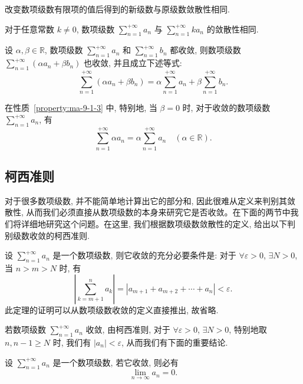\begin{property}\label{property:ma-9-1-1}
改变数项级数有限项的值后得到的新级数与原级数敛散性相同.
\end{property}


\begin{property}\label{property:ma-9-1-2}
对于任意常数 $k\neq0$, 数项级数 $\sum\limits_{n=1}^{+\infty}a_n$ 与 $\sum\limits_{n=1}^{+\infty}ka_n$ 的敛散性相同.
\end{property}


\begin{property}\label{property:ma-9-1-3}
设 $\alpha,\beta\in\mathbb R$, 数项级数 $\sum\limits_{n=1}^{+\infty}a_n$ 和 $\sum\limits_{n=1}^{+\infty}b_n$ 都收敛, 则数项级数 $\sum\limits_{n=1}^{+\infty}(\alpha a_n+\beta b_n)$ 也收敛, 并且成立下述等式:
\[
  \sum_{n=1}^{+\infty}(\alpha a_n+\beta b_n)
  =\alpha\sum_{n=1}^{+\infty}a_n+\beta\sum_{n=1}^{+\infty}b_n.
\]
\end{property}

在性质~\ref{property:ma-9-1-3} 中, 特别地, 当 $\beta=0$ 时, 对于收敛的数项级数 $\sum\limits_{n=1}^{+\infty}a_n$, 有
\[
  \sum_{n=1}^{+\infty}\alpha a_n=\alpha\sum_{n=1}^{+\infty}a_n\quad(\alpha\in\mathbb R).
\]

\subsection{柯西准则}
\label{subsec:ma-9-1-2}

对于很多数项级数, 并不能简单地计算出它的部分和, 因此很难从定义来判别其敛散性, 从而我们必须直接从数项级数的本身来研究它是否收敛。在下面的两节中我们将详细地研究这个问题。在这里, 我们根据数项级数敛散性的定义, 给出以下判别级数收敛的柯西准则.

\begin{theorem}[{柯西准则}]\label{theorem:ma-9-1-4}
设 $\sum\limits_{n=1}^{+\infty}a_n$ 是一个数项级数, 则它收敛的充分必要条件是: 对于 $\forall\varepsilon>0$, $\exists N>0$, 当 $n>m>N$ 时, 有
\[
  \left|\sum_{k=m+1}^n a_k\right|
  =|a_{m+1}+a_{m+2}+\cdots+a_n|<\varepsilon.
\]
此定理的证明可以从数项级数收敛的定义直接推出, 故省略.
\end{theorem}

若数项级数 $\sum\limits_{n=1}^{+\infty}a_n$ 收敛, 由柯西准则, 对于 $\forall\varepsilon>0$, $\exists N>0$, 特别地取 $n,n-1\geq N$ 时, 我们有 $|a_n|<\varepsilon$, 从而我们有下面的重要结论.

\begin{corollary}\label{corollary:ma-9-source-12}
设 $\sum\limits_{n=1}^{+\infty}a_n$ 是一个数项级数, 若它收敛, 则必有
\[
  \lim_{n\to\infty}a_n=0.
\]
\end{corollary}

